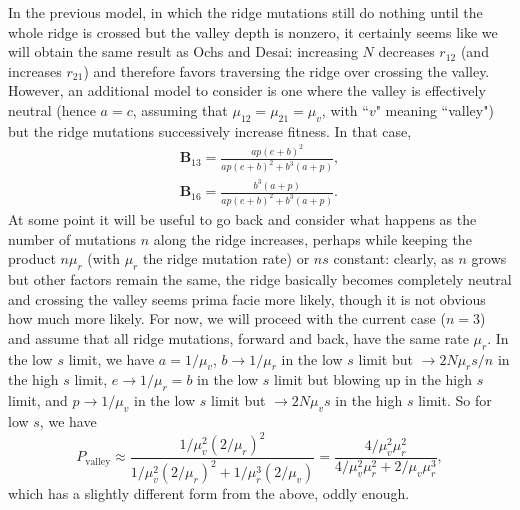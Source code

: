 \documentclass[11pt]{revtex4}
\begin{document}
In the previous model, in which the ridge mutations still do nothing until the whole ridge is crossed but the valley depth is nonzero, it certainly seems like we will obtain the same result as Ochs and Desai: increasing $N$ decreases $r_{12}$ (and increases $r_{21}$) and therefore favors traversing the ridge over crossing the valley.
However, an additional model to consider is one where the valley is effectively neutral (hence $a = c$, assuming that $\mu_{12} = \mu_{21} = \mu_v$, with ``$v$" meaning ``valley") but the ridge mutations successively increase fitness.
In that case,
\begin{align}
\textbf{B}_{13} = \frac{ap(e+b)^2}{ap(e+b)^2 + b^3(a+p)}, \\
\textbf{B}_{16} = \frac{b^3(a+p)}{ap(e+b)^2 + b^3(a+p)}.
\end{align}
At some point it will be useful to go back and consider what happens as the number of mutations $n$ along the ridge increases, perhaps while keeping the product $n\mu_r$ (with $\mu_r$ the ridge mutation rate) or $ns$ constant: clearly, as $n$ grows but other factors remain the same, the ridge basically becomes completely neutral and crossing the valley seems prima facie more likely, though it is not obvious how much more likely.
For now, we will proceed with the current case ($n = 3$) and assume that all ridge mutations, forward and back, have the same rate $\mu_r$.
In the low $s$ limit, we have $a = 1/\mu_v$, $b \to 1/\mu_r$ in the low $s$ limit but $\to 2N\mu_r s/n$ in the high $s$ limit, $e \to 1/\mu_r = b$ in the low $s$ limit but blowing up in the high $s$ limit, and $p \to 1/\mu_v$ in the low $s$ limit but $\to 2N\mu_v s$ in the high $s$ limit.
So for low $s$, we have
\begin{equation}
P_{\mathrm{valley}} \approx \frac{1/\mu_v^2(2/\mu_r)^2}{1/\mu_v^2(2/\mu_r)^2 + 1/\mu_r^3(2/\mu_v)} = \frac{4/\mu_v^2\mu_r^2}{4/\mu_v^2\mu_r^2 + 2/\mu_v\mu_r^3},
\end{equation}
which has a slightly different form from the above, oddly enough.
\end{document}
